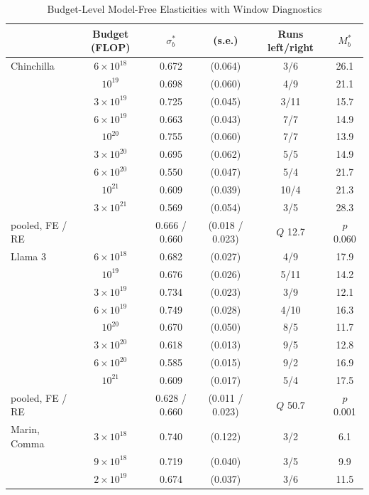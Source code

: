 \begin{table}[tp]
\centering
\caption{Budget-Level Model-Free Elasticities with Window Diagnostics}
\label{tab:sigmaC-budgets}
\footnotesize
\setlength{\tabcolsep}{2pt}
\begin{tabular*}{\textwidth}{@{\extracolsep{\fill}}>{\raggedright\arraybackslash}p{}ccccc@{}}
\toprule
 & Budget (FLOP) & $\sigma^*_b$ & (s.e.) & Runs left/right & $M^*_b$ \\
\midrule
Chinchilla & $6\times10^{18}$ & 0.672 & (0.064) & 3/6 & 26.1 \\
 & $10^{19}$ & 0.698 & (0.060) & 4/9 & 21.1 \\
 & $3\times10^{19}$ & 0.725 & (0.045) & 3/11 & 15.7 \\
 & $6\times10^{19}$ & 0.663 & (0.043) & 7/7 & 14.9 \\
 & $10^{20}$ & 0.755 & (0.060) & 7/7 & 13.9 \\
 & $3\times10^{20}$ & 0.695 & (0.062) & 5/5 & 14.9 \\
 & $6\times10^{20}$ & 0.550 & (0.047) & 5/4 & 21.7 \\
 & $10^{21}$ & 0.609 & (0.039) & 10/4 & 21.3 \\
 & $3\times10^{21}$ & 0.569 & (0.054) & 3/5 & 28.3 \\
\quad pooled, FE / RE & & 0.666 / 0.660 & (0.018 / 0.023) & $Q$ 12.7 & $p$ 0.060 \\
\addlinespace
Llama 3 & $6\times10^{18}$ & 0.682 & (0.027) & 4/9 & 17.9 \\
 & $10^{19}$ & 0.676 & (0.026) & 5/11 & 14.2 \\
 & $3\times10^{19}$ & 0.734 & (0.023) & 3/9 & 12.1 \\
 & $6\times10^{19}$ & 0.749 & (0.028) & 4/10 & 16.3 \\
 & $10^{20}$ & 0.670 & (0.050) & 8/5 & 11.7 \\
 & $3\times10^{20}$ & 0.618 & (0.013) & 9/5 & 12.8 \\
 & $6\times10^{20}$ & 0.585 & (0.015) & 9/2 & 16.9 \\
 & $10^{21}$ & 0.609 & (0.017) & 5/4 & 17.5 \\
\quad pooled, FE / RE & & 0.628 / 0.660 & (0.011 / 0.023) & $Q$ 50.7 & $p$ 0.001 \\
\addlinespace
Marin, Comma & $3\times10^{18}$ & 0.740 & (0.122) & 3/2 & 6.1 \\
 & $9\times10^{18}$ & 0.719 & (0.040) & 3/5 & 9.9 \\
 & $2\times10^{19}$ & 0.674 & (0.037) & 3/6 & 11.5 \\

\end{tabular*}
\end{table}
